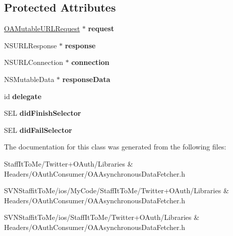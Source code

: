\subsection*{\-Protected \-Attributes}
\begin{DoxyCompactItemize}
\item 
\hypertarget{interface_o_a_asynchronous_data_fetcher_af7fd547996be7e3727a300d001df39a5}{
\hyperlink{interface_o_a_mutable_u_r_l_request}{\-O\-A\-Mutable\-U\-R\-L\-Request} $\ast$ {\bfseries request}}
\label{interface_o_a_asynchronous_data_fetcher_af7fd547996be7e3727a300d001df39a5}

\item 
\hypertarget{interface_o_a_asynchronous_data_fetcher_aec36de29766c77c1ea067886e9b6afac}{
\-N\-S\-U\-R\-L\-Response $\ast$ {\bfseries response}}
\label{interface_o_a_asynchronous_data_fetcher_aec36de29766c77c1ea067886e9b6afac}

\item 
\hypertarget{interface_o_a_asynchronous_data_fetcher_a32aa9bb851df50e8e939a13acc81b591}{
\-N\-S\-U\-R\-L\-Connection $\ast$ {\bfseries connection}}
\label{interface_o_a_asynchronous_data_fetcher_a32aa9bb851df50e8e939a13acc81b591}

\item 
\hypertarget{interface_o_a_asynchronous_data_fetcher_a659faf6ec260799c4c06b8867cf28426}{
\-N\-S\-Mutable\-Data $\ast$ {\bfseries response\-Data}}
\label{interface_o_a_asynchronous_data_fetcher_a659faf6ec260799c4c06b8867cf28426}

\item 
\hypertarget{interface_o_a_asynchronous_data_fetcher_af68e25005c2d921c84c3bbf5b13099be}{
id {\bfseries delegate}}
\label{interface_o_a_asynchronous_data_fetcher_af68e25005c2d921c84c3bbf5b13099be}

\item 
\hypertarget{interface_o_a_asynchronous_data_fetcher_a88e9a0b9c06e36cba6860a8fe5124f33}{
\-S\-E\-L {\bfseries did\-Finish\-Selector}}
\label{interface_o_a_asynchronous_data_fetcher_a88e9a0b9c06e36cba6860a8fe5124f33}

\item 
\hypertarget{interface_o_a_asynchronous_data_fetcher_ab3cb9436dfbee18054162d5d4df89fb1}{
\-S\-E\-L {\bfseries did\-Fail\-Selector}}
\label{interface_o_a_asynchronous_data_fetcher_ab3cb9436dfbee18054162d5d4df89fb1}

\end{DoxyCompactItemize}


\-The documentation for this class was generated from the following files\-:\begin{DoxyCompactItemize}
\item 
\-Staff\-It\-To\-Me/\-Twitter+\-O\-Auth/\-Libraries \& Headers/\-O\-Auth\-Consumer/\-O\-A\-Asynchronous\-Data\-Fetcher.\-h\item 
\-S\-V\-N\-Staffit\-To\-Me/ios/\-My\-Code/\-Staff\-It\-To\-Me/\-Twitter+\-O\-Auth/\-Libraries \& Headers/\-O\-Auth\-Consumer/\-O\-A\-Asynchronous\-Data\-Fetcher.\-h\item 
\-S\-V\-N\-Staffit\-To\-Me/ios/\-Staff\-It\-To\-Me/\-Twitter+\-O\-Auth/\-Libraries \& Headers/\-O\-Auth\-Consumer/\-O\-A\-Asynchronous\-Data\-Fetcher.\-h\end{DoxyCompactItemize}
